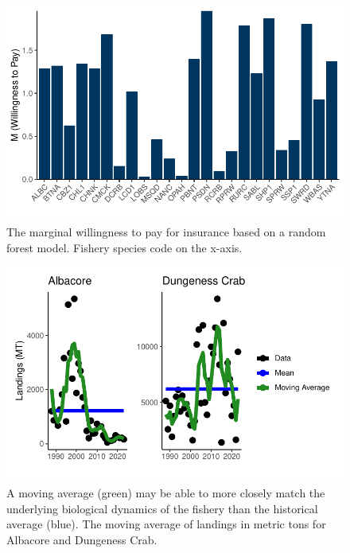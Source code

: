 \documentclass[
  letterpaper,
  DIV=11,
  numbers=noendperiod]{scrartcl}
\begin{document}
\begin{figure}

{\centering \includegraphics{ibi-ml_files/figure-pdf/fig-utrf-1.pdf}

}

\caption{\label{fig-utrf}The marginal willingness to pay for insurance
based on a random forest model. Fishery species code on the x-axis.}

\end{figure}

\begin{figure}

{\centering \includegraphics{ibi-ml_files/figure-pdf/fig-avg-1.pdf}

}

\caption{\label{fig-avg}A moving average (green) may be able to more
closely match the underlying biological dynamics of the fishery than the
historical average (blue). The moving average of landings in metric tons
for Albacore and Dungeness Crab.}

\end{figure}
\end{document}
